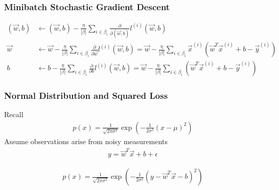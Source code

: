 \documentclass[a4paper,12pt]{article}
\theoremstyle{definition}
\begin{document}
    \subsubsection*{Minibatch Stochastic Gradient Descent}
    \begin{equation*}
        \begin{aligned}
        (\vec{w},b) &\leftarrow (\vec{w},b) - \frac{\eta}{|\beta|}\sum_{i\in\beta_i}\frac{\partial}{\partial(\vec{w},b)}l^{(i)}(\vec{w},b) \\
        \vec{w}     &\leftarrow \vec{w} - \frac{\eta}{|\beta|}\sum_{i\in\beta_i}\frac{\partial}{\partial\vec{w}}l^{(i)}(\vec{w},b) = \vec{w}- \frac{\eta}{|\beta|}\sum_{i\in\beta_i}\vec{x}^{(i)}(\vec{w}^T\vec{x}^{(i)} + b - \vec{y}^{(i)}) \\
        b           &\leftarrow b - \frac{\eta}{|\beta|}\sum_{i\in\beta_i}\frac{\partial}{\partial b}l^{(i)}(\vec{w},b) = \vec{w}- \frac{\eta}{|\beta|}\sum_{i\in\beta_i}(\vec{w}^T\vec{x}^{(i)} + b - \vec{y}^{(i)})
        \end{aligned}
    \end{equation*}

    \subsubsection*{Normal Distribution and Squared Loss}
    Recall
    \begin{equation*}
        \begin{aligned}
            p(x) = \frac{1}{\sqrt{2\pi\sigma^2}}\exp({-\frac{1}{2\sigma^2}(x-\mu)^2})
        \end{aligned}
    \end{equation*}
    Assume observations arise from noisy measurements
    \begin{equation*}
        \begin{aligned}
            y = \vec{w}^T\vec{x} + b + \epsilon
        \end{aligned}
    \end{equation*}

    \begin{equation*}
        \begin{aligned}
            p(x) = \frac{1}{\sqrt{2\pi\sigma^2}}\exp({-\frac{1}{2\sigma^2}(y - \vec{w}^T\vec{x} - b)^2})
        \end{aligned}
    \end{equation*}
\end{document}
